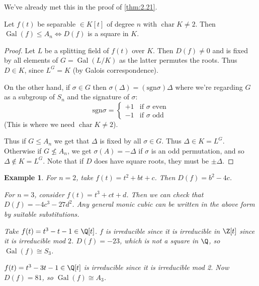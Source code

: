 \documentclass{article}
\DeclareMathOperator{\chara}{char}
\DeclareMathOperator{\Gal}{Gal}
\newtheorem{nexample}[nthm]{Example}
\begin{document}
\begin{remark}
    We've already met this in the proof of \cref{thm:2.21}.
\end{remark}

\begin{nlemma}\label{lem:3.11}
    Let $f(t)$ be separable $\in K[t]$ of degree $n$ with $\chara K \neq 2$.
    Then $\Gal(f) \leq A_n \iff D (f)$ is a square in $K$.
\end{nlemma}

\begin{proof}
    Let $L$ be a splitting field of $f(t)$ over $K$.
    Then $D(f) \neq 0$ and is fixed by all elements of $G = \Gal(L/K)$ as the latter permutes the roots.
    Thus $D \in K$, since $L^G = K$ (by Galois correspondence).

    On the other hand, if $\sigma\in G$ then $\sigma(\Delta) = (\mathrm{sgn} \sigma) \Delta$ where we're regarding $G$ as a subgroup of $S_n$ and the signature of $\sigma$:
    \begin{equation*}
        \mathrm{sgn} \sigma =
        \begin{cases}
            +1 & \text{if $\sigma$ even} \\
            -1 & \text{if $\sigma$ odd}
        \end{cases}
    \end{equation*}
    (This is where we need $\chara K \neq 2$).

    Thus if $G \leq A_n$ we get that $\Delta$ is fixed by all $\sigma \in G$.
    Thus $\Delta \in K = L^G$.
    Otherwise if $G \nleq A_n$, we get $\sigma(A) = -\Delta$ if $\sigma$ is an odd permutation, and so $\Delta \notin K=L^G$.
    Note that if $D$ does have square roots, they must be $\pm \Delta$.
\end{proof}

\begin{nexample}\label{eg:3.12}
    For $n=2$, take $f(t) = t^2 + bt + c$. Then $D(f) = b^2 - 4c$.

    For $n=3$, consider $f(t) = t^3 + ct + d$. Then we can check that $D(f) = -4c^3 - 27d^2$.
    Any general monic cubic can be written in the above form by suitable substitutions.

    Take $f(t) = t^3 - t - 1 \in \Q[t]$. $f$ is irreducible since it is irreducible in $\Z[t]$ since it is irreducible mod $2$.
    $D(f) = -23$, which is not a square in $\Q$, so $\Gal(f) \cong S_3$.

    $f(t) = t^3 - 3t-1 \in \Q[t]$ is irreducible since it is irreducible mod 2. Now $D(f) = 81$, so $\Gal(f) \cong A_3$.
\end{nexample}
\end{document}
